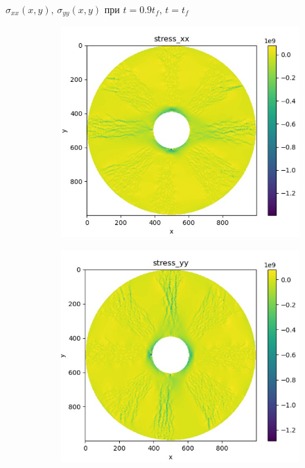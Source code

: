 \documentclass{beamer}
\begin{document}
	\begin{frame}{$\sigma_{xx}(x,y),\,\sigma_{yy}(x,y)$ при $t = 0.9t_f,\,t=t_f$}
	\begin{figure}[H]
		\centering
		\begin{subfigure}[H]{0.4\textwidth}
			\includegraphics[width=\textwidth]{stressx_2tf}
		\end{subfigure}
		\qquad\qquad
		\begin{subfigure}[H]{0.4\textwidth}
			\includegraphics[width=\textwidth]{stressy_2tf}

\end{subfigure}
\end{figure}
\end{frame}
\end{document}
